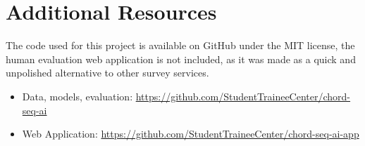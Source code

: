 \documentclass{article}
\begin{document}
\section{Additional Resources} \label{Resources}

The code used for this project is available on GitHub under the MIT license, the human evaluation web application is not included, as it was made as a quick and unpolished alternative to other survey services.

\begin{itemize}
    \item Data, models, evaluation: \href{https://github.com/StudentTraineeCenter/chord-seq-ai}{https://github.com/StudentTraineeCenter/chord-seq-ai}

    \item Web Application: \href{https://github.com/StudentTraineeCenter/chord-seq-ai-app}{https://github.com/StudentTraineeCenter/chord-seq-ai-app}
\end{itemize}

\printbibliography
\end{document}

